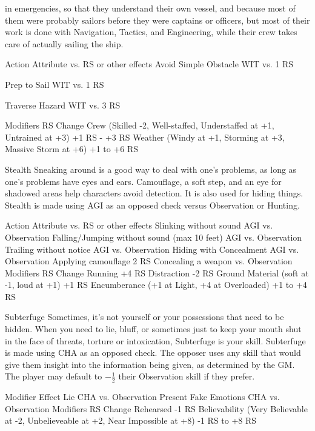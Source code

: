 \documentclass[oneside,11pt,english]{book}
\begin{document}
in emergencies, so that they understand their own vessel, and because most of them were probably sailors 
before they were captains or officers, but most of their work is done with Navigation, Tactics, and 
Engineering, while their crew takes care of actually sailing the ship. 

 

Action Attribute vs. RS or other effects 
Avoid Simple Obstacle WIT vs. 1 RS 

Prep to Sail WIT vs. 1 RS 

Traverse Hazard WIT vs. 3 RS 

Modifiers RS Change 
Crew (Skilled -2, Well-staffed, Understaffed at +1, Untrained at +3) +1 RS - +3 RS 
Weather (Windy at +1, Storming at +3, Massive Storm at +6) +1 to +6 RS 

 

 

Stealth 
Sneaking around is a good way to deal with one’s problems, as long as one’s problems have eyes and 
ears. Camouflage, a soft step, and an eye for shadowed areas help characters avoid detection. It is also 
used for hiding things. 
Stealth is made using AGI as an opposed check versus Observation or Hunting. 

 

Action Attribute vs. RS or other effects 
Slinking without sound AGI vs. Observation 
Falling/Jumping without sound (max 10 feet) AGI vs. Observation 
Trailing without notice AGI vs. Observation 
Hiding with Concealment AGI vs. Observation 
Applying camouflage 2 RS 
Concealing a weapon vs. Observation 
Modifiers RS Change 
Running +4 RS 
Distraction -2 RS 
Ground Material (soft at -1, loud at +1) +1 RS 
Encumberance (+1 at Light, +4 at Overloaded) +1 to +4 RS 

 


 

Subterfuge 
Sometimes, it’s not yourself or your possessions that need to be hidden. When you need to lie, bluff, or 
sometimes just to keep your mouth shut in the face of threats, torture or intoxication, Subterfuge is your 
skill. 
Subterfuge is made using CHA as an opposed check. The opposer uses any skill that would give them 
insight into the information being given, as determined by the GM. The player may default to $ -\frac{1}{2} $ their 
Observation skill if they prefer. 

 

Modifier Effect 
Lie CHA vs. Observation 
Present Fake Emotions CHA vs. Observation 
Modifiers RS Change 
Rehearsed -1 RS 
Believability (Very Believable at -2, Unbelieveable at +2, Near Impossible at +8) -1 RS to +8 RS 
\end{document}

